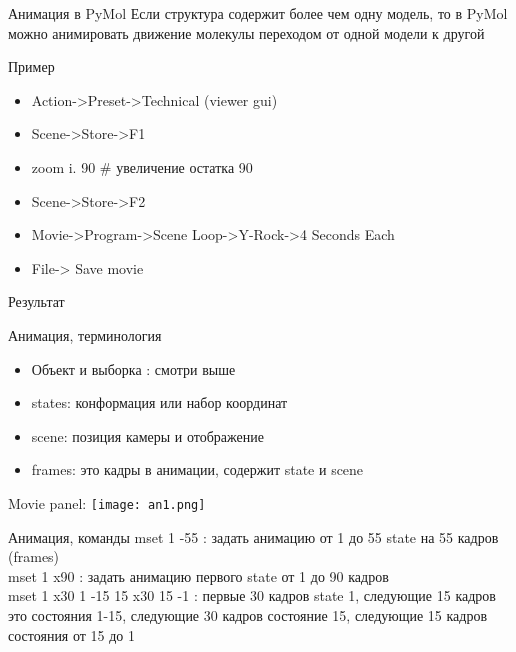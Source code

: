 \begin{frame}{Анимация в PyMol}
\small Если структура содержит более чем одну модель, то в PyMol можно
            анимировать движение молекулы переходом от одной модели к другой\\
\centering
\end{frame}


	\begin{frame}{Пример}
		\begin{itemize}
			\item Action->Preset->Technical (viewer gui)
			\item Scene->Store->F1
			\item zoom i. 90   \# увеличение остатка 90
			\item Scene->Store->F2
			\item Movie->Program->Scene Loop->Y-Rock->4 Seconds Each
			\item File-> Save movie
			\end{itemize}
		\end{frame}

		\begin{frame}{Результат}
          \begin{center} 
          \end{center}
	  \end{frame}

	  \begin{frame}{Анимация, терминология}
		  \begin{itemize}
			  \item Объект и выборка : смотри выше
			  \item states: конформация или набор координат
			  \item scene: позиция камеры и отображение
			  \item frames: это кадры в анимации, содержит state и scene
			  \end{itemize}
			  \begin{center}
			  Movie panel: \hspace{.5cm}
          \texttt{[image: an1.png]}
	  \end{center}
	  \end{frame}

	  \begin{frame}{Анимация, команды}
		  \textcolor{blue!40!white}{mset 1 -55} : задать анимацию от 1 до 55 state на 55 кадров (frames) \\
		  \textcolor{blue!40!white}{mset 1 x90} : задать анимацию первого state от 1 до 90 кадров\\
		  \textcolor{blue!40!white}{mset 1 x30 1 -15 15 x30 15 -1 }: первые 30 кадров state 1, следующие 15 кадров это состояния 1-15, следующие 30 кадров состояние 15, следующие 15 кадров состояния от 15 до 1
	  \end{frame}

